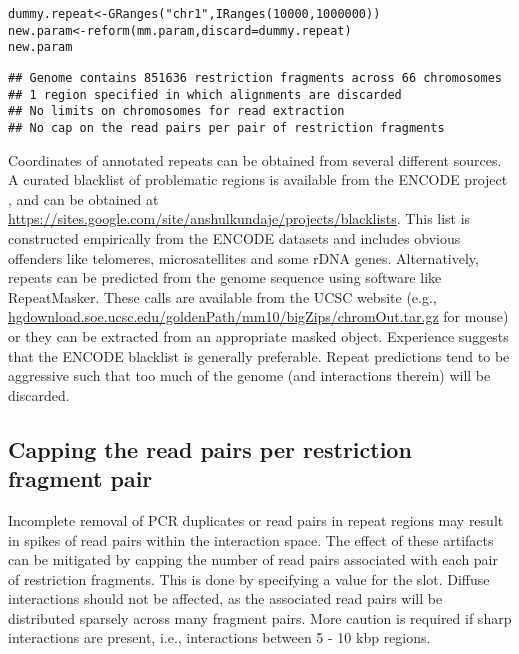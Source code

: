 \documentclass{report}\usepackage[]{graphicx}\usepackage[usenames,dvipsnames]{color}
\newcommand{\hlnum}[1]{\textcolor[rgb]{0.816,0.125,0.439}{#1}}%
\newcommand{\hlstr}[1]{\textcolor[rgb]{0.251,0.627,0.251}{#1}}%
\newcommand{\hlstd}[1]{\textcolor[rgb]{0.251,0.251,0.251}{#1}}%
\newcommand{\hlkwb}[1]{\textcolor[rgb]{0,0,0}{#1}}%
\newcommand{\hlkwc}[1]{\textcolor[rgb]{0.251,0.251,0.251}{#1}}%
\newcommand{\hlkwd}[1]{\textcolor[rgb]{0.878,0.439,0.125}{#1}}%
\newenvironment{knitrout}{}{} %
\begin{document}
\begin{knitrout}
\color{fgcolor}\begin{kframe}
\begin{alltt}
\hlstd{dummy.repeat} \hlkwb{<-} \hlkwd{GRanges}\hlstd{(}\hlstr{"chr1"}\hlstd{,} \hlkwd{IRanges}\hlstd{(}\hlnum{10000}\hlstd{,} \hlnum{1000000}\hlstd{))}
\hlstd{new.param} \hlkwb{<-} \hlkwd{reform}\hlstd{(mm.param,} \hlkwc{discard}\hlstd{=dummy.repeat)}
\hlstd{new.param}
\end{alltt}
\begin{verbatim}
## Genome contains 851636 restriction fragments across 66 chromosomes
## 1 region specified in which alignments are discarded
## No limits on chromosomes for read extraction
## No cap on the read pairs per pair of restriction fragments
\end{verbatim}
\end{kframe}
\end{knitrout}

Coordinates of annotated repeats can be obtained from several different sources.
A curated blacklist of problematic regions is available from the ENCODE project \cite{dunham2012encode}, and can be obtained at \url{https://sites.google.com/site/anshulkundaje/projects/blacklists}.
This list is constructed empirically from the ENCODE datasets and includes obvious offenders like telomeres, microsatellites and some rDNA genes.
Alternatively, repeats can be predicted from the genome sequence using software like RepeatMasker.
These calls are available from the UCSC website (e.g., \url{hgdownload.soe.ucsc.edu/goldenPath/mm10/bigZips/chromOut.tar.gz} for mouse) or they can be extracted from an appropriate masked  object. 
Experience suggests that the ENCODE blacklist is generally preferable.
Repeat predictions tend to be aggressive such that too much of the genome (and interactions therein) will be discarded.

\subsection{Capping the read pairs per restriction fragment pair}
Incomplete removal of PCR duplicates or read pairs in repeat regions may result in spikes of read pairs within the interaction space.
The effect of these artifacts can be mitigated by capping the number of read pairs associated with each pair of restriction fragments.
This is done by specifying a value for the  slot.
Diffuse interactions should not be affected, as the associated read pairs will be distributed sparsely across many fragment pairs.
More caution is required if sharp interactions are present, i.e., interactions between 5 - 10 kbp regions.
\end{document}
